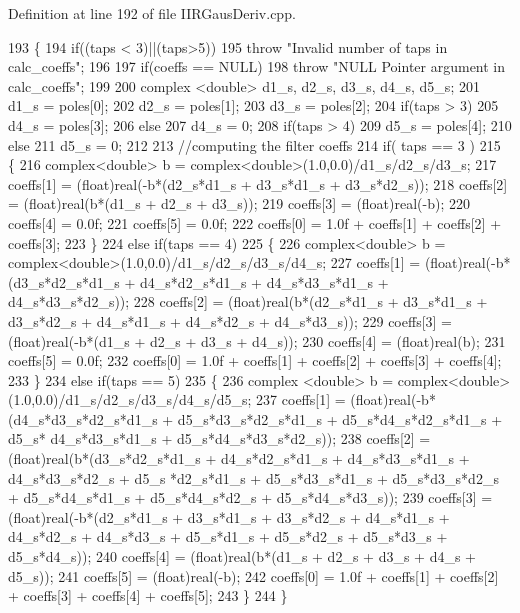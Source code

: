 Definition at line 192 of file I\+I\+R\+Gaus\+Deriv.\+cpp.


\begin{DoxyCode}
193 \{
194     \textcolor{keywordflow}{if}((taps < 3)||(taps>5))
195         \textcolor{keywordflow}{throw} \textcolor{stringliteral}{"Invalid number of taps in calc\_coeffs"};
196     
197     \textcolor{keywordflow}{if}(coeffs == NULL)
198         \textcolor{keywordflow}{throw} \textcolor{stringliteral}{"NULL Pointer argument in calc\_coeffs"};
199 
200     complex <double> d1\_s, d2\_s, d3\_s, d4\_s, d5\_s;
201     d1\_s = poles[0];
202     d2\_s = poles[1];
203     d3\_s = poles[2];
204     \textcolor{keywordflow}{if}(taps > 3)
205         d4\_s = poles[3];
206     \textcolor{keywordflow}{else}
207         d4\_s = 0;
208     \textcolor{keywordflow}{if}(taps > 4)
209         d5\_s = poles[4];
210     \textcolor{keywordflow}{else}
211         d5\_s = 0;
212     
213     \textcolor{comment}{//computing the filter coeffs}
214     \textcolor{keywordflow}{if}( taps == 3 )
215     \{
216         complex<double> b = complex<double>(1.0,0.0)/d1\_s/d2\_s/d3\_s;
217         coeffs[1] = (float)real(-b*(d2\_s*d1\_s + d3\_s*d1\_s + d3\_s*d2\_s));
218         coeffs[2] = (float)real(b*(d1\_s + d2\_s + d3\_s));
219         coeffs[3] = (float)real(-b);
220         coeffs[4] = 0.0f;
221         coeffs[5] = 0.0f;
222         coeffs[0] = 1.0f + coeffs[1] + coeffs[2] + coeffs[3];
223     \}
224     \textcolor{keywordflow}{else} \textcolor{keywordflow}{if}(taps == 4)
225     \{
226         complex<double> b = complex<double>(1.0,0.0)/d1\_s/d2\_s/d3\_s/d4\_s;
227         coeffs[1] = (float)real(-b*(d3\_s*d2\_s*d1\_s + d4\_s*d2\_s*d1\_s + d4\_s*d3\_s*d1\_s + d4\_s*d3\_s*d2\_s));
228         coeffs[2] = (float)real(b*(d2\_s*d1\_s + d3\_s*d1\_s + d3\_s*d2\_s + d4\_s*d1\_s + d4\_s*d2\_s + d4\_s*d3\_s));
229         coeffs[3] = (float)real(-b*(d1\_s + d2\_s + d3\_s + d4\_s));
230         coeffs[4] = (float)real(b);
231         coeffs[5] = 0.0f;
232         coeffs[0] = 1.0f + coeffs[1] + coeffs[2] + coeffs[3] + coeffs[4];
233     \}
234     \textcolor{keywordflow}{else} \textcolor{keywordflow}{if}(taps == 5)
235     \{
236         complex <double> b = complex<double>(1.0,0.0)/d1\_s/d2\_s/d3\_s/d4\_s/d5\_s;
237         coeffs[1] = (float)real(-b*(d4\_s*d3\_s*d2\_s*d1\_s + d5\_s*d3\_s*d2\_s*d1\_s + d5\_s*d4\_s*d2\_s*d1\_s + d5\_s*
      d4\_s*d3\_s*d1\_s + d5\_s*d4\_s*d3\_s*d2\_s));
238         coeffs[2] = (float)real(b*(d3\_s*d2\_s*d1\_s + d4\_s*d2\_s*d1\_s + d4\_s*d3\_s*d1\_s + d4\_s*d3\_s*d2\_s + d5\_s
      *d2\_s*d1\_s + d5\_s*d3\_s*d1\_s + d5\_s*d3\_s*d2\_s + d5\_s*d4\_s*d1\_s + d5\_s*d4\_s*d2\_s + d5\_s*d4\_s*d3\_s));
239         coeffs[3] = (float)real(-b*(d2\_s*d1\_s + d3\_s*d1\_s + d3\_s*d2\_s + d4\_s*d1\_s + d4\_s*d2\_s + d4\_s*d3\_s +
       d5\_s*d1\_s + d5\_s*d2\_s + d5\_s*d3\_s + d5\_s*d4\_s));
240         coeffs[4] = (float)real(b*(d1\_s + d2\_s + d3\_s + d4\_s + d5\_s));
241         coeffs[5] = (float)real(-b);
242         coeffs[0] = 1.0f + coeffs[1] + coeffs[2] + coeffs[3] + coeffs[4] + coeffs[5];    
243     \}
244 \}
\end{DoxyCode}
